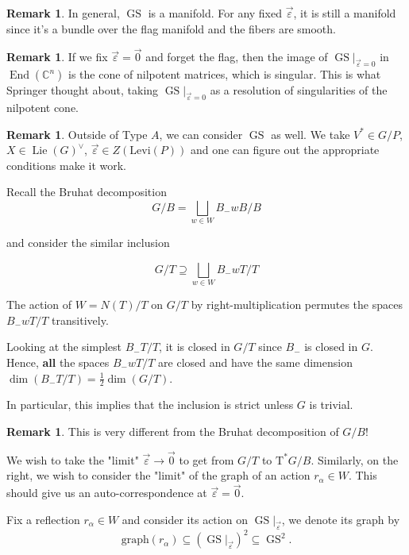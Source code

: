 \documentclass[12pt]{amsart}
\numberwithin{equation}{section}
\theoremstyle{definition}
\newtheorem{Remark}[equation]{Remark}
\numberwithin{figure}{section}
\newcommand{\C}{\mathbb{C}}
\newcommand{\End}{\operatorname{End}}
\newcommand{\GS}{\operatorname{GS}}
\newcommand{\Lie}{\operatorname{Lie}}
\begin{document}
\begin{Remark}
	In general, $\GS$ is a manifold.
	For any fixed ${\overrightarrow{\varepsilon}}$, it is still a manifold since it's a bundle over the flag manifold and the fibers are smooth.
\end{Remark}

\begin{Remark}
	If we fix ${\overrightarrow{\varepsilon}} = {\overrightarrow{0}}$ and forget the flag, then the image of $\GS|_{\overrightarrow{\varepsilon}=0}$ in $\End(\C^n)$ is the cone of nilpotent matrices, which is singular. This is what Springer thought about, taking $\GS|_{\overrightarrow{\varepsilon}=0}$ as a resolution of singularities of the nilpotent cone.
\end{Remark}

\begin{Remark}
	Outside of Type $A$, we can consider $\GS$ as well.
	We take $V^* \in G/P$, $X \in \Lie(G)^\vee$, $\overrightarrow{\varepsilon} \in Z(\text{Levi}(P))$ and one can figure out the appropriate conditions make it work.
\end{Remark}

Recall the Bruhat decomposition
\[
	G/B = \bigsqcup_{w \in W} B_- w B / B
\]

and consider the similar inclusion

\[
	G/T \supseteq \bigsqcup_{w \in W} B_- w T/T
\]

The action of $W = N(T)/T$ on $G/T$ by right-multiplication permutes the spaces $B_- w T/T$ transitively.

Looking at the simplest $B_- T/T$, it is closed in $G/T$ since $B_-$ is closed in $G$. Hence, \textbf{all} the spaces $B_- w T/T$ are closed and have the same dimension $\dim (B_- T/T) = \frac{1}{2} \dim (G/T)$.

In particular, this implies that the inclusion is strict unless $G$ is trivial.

\begin{Remark}
	This is very different from the Bruhat decomposition of $G/B$!
\end{Remark}

We wish to take the "limit" ${\overrightarrow{\varepsilon}} \to {\overrightarrow{0}}$ to get from $G/T$ to $\text{T}^* G/B$. Similarly, on the right, we wish to consider the "limit" of the graph of an action $r_\alpha \in W$. This should give us an auto-correspondence at $\overrightarrow{\varepsilon} = \overrightarrow{0}$.

Fix a reflection $r_\alpha \in W$ and consider its action on $\GS|_{\overrightarrow{\varepsilon}}$, we denote its graph by
\[
	\text{graph}(r_\alpha) \subseteq
	(\GS|_{\overrightarrow{\varepsilon}})^2 \subseteq \GS^2.
\]
\end{document}
